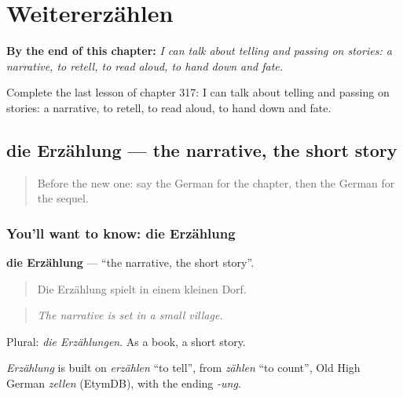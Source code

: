 
\chapter{Weitererzählen}
\label{ch:ge-weitererzahlen}

\begin{chapteropening}
\textbf{By the end of this chapter:} \emph{I can talk about telling and passing on stories: a narrative, to retell, to read aloud, to hand down and fate.}

Complete the last lesson of chapter 317: I can talk about telling and passing on stories: a narrative, to retell, to read aloud, to hand down and fate.
\end{chapteropening}

\section[die Erzählung]{die Erzählung — the narrative, the short story}

\label{lesson:GE-C317-erzaehlung}



\begin{quote}
Before the new one: say the German for the chapter, then the German for the sequel.
\end{quote}

\subsection*{You'll want to know: die Erzählung}
\textbf{die Erzählung} — \textquotedblleft{}the narrative, the short story\textquotedblright{}.

\begin{quote}
Die Erzählung spielt in einem kleinen Dorf.
\end{quote}

\begin{quote}
\emph{The narrative is set in a small village.}
\end{quote}

Plural: \emph{die Erzählungen}. As a book, a short story.

\begin{cousinweb}
\emph{Erzählung} is built on \emph{erzählen} \textquotedblleft{}to tell\textquotedblright{}, from \emph{zählen} \textquotedblleft{}to count\textquotedblright{}, Old High German \emph{zellen} (EtymDB), with the ending \emph{-ung}.
\end{cousinweb}


